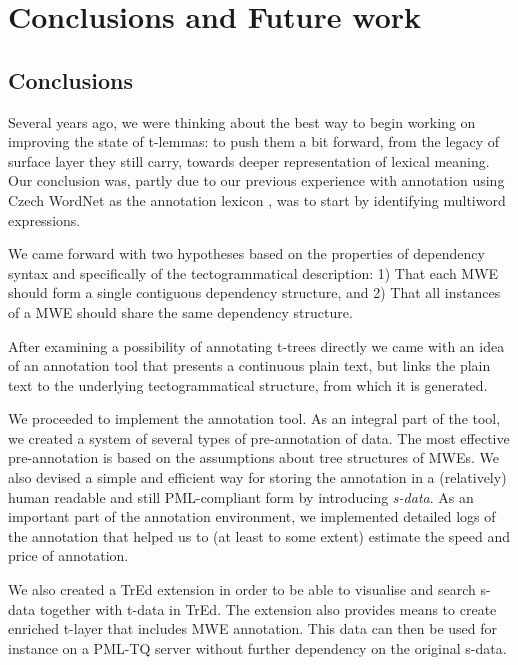 
\chapter{Conclusions and Future work}
\label{sec:conclusion}

\section{Conclusions}

Several years ago, we were thinking about the best way to begin working on improving the state of t-lemmas: to push them a bit forward, from the legacy of surface layer they still carry, towards deeper representation of lexical meaning. Our conclusion was, partly due to our previous experience with annotation using Czech WordNet as the annotation lexicon \citep{holub:2003,bejcek:2006}, was to start by identifying multiword expressions.

We came forward with two hypotheses based on the properties of dependency syntax and specifically of the tectogrammatical description: 1) That each MWE should form a single contiguous dependency structure, and 2) That all instances of a MWE should share the same dependency structure.

After examining a possibility of annotating t-trees directly we came with an idea of an annotation tool that presents a continuous plain text, but links the plain text to the underlying tectogrammatical structure, from which it is generated. 

We proceeded to implement the annotation tool. As an integral part of the tool, we created a system of several types of pre-annotation of data. The most effective pre-annotation is based on the assumptions about tree structures of MWEs. We also devised a simple and efficient way for storing the annotation in a (relatively) human readable and still PML-compliant form by introducing \emph{s-data}. As an important part of the annotation environment, we implemented detailed logs of the annotation that helped us to (at least to some extent) estimate the speed and price of annotation.

We also created a TrEd extension in order to be able to visualise and search s-data together with t-data in TrEd. The extension also provides means to create enriched t-layer that includes MWE annotation. This data can then be used for instance on a PML-TQ server without further dependency on the original s-data.

